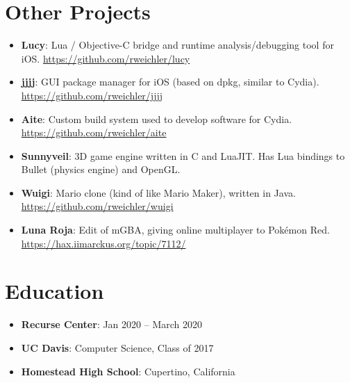 \documentclass[letterpaper,11pt]{article}
\newcommand{\resumeItem}[2]{
  \item\small{
    \textbf{#1}{: #2 \vspace{-2.5pt}}
  }
}
\newcommand{\resumeSubItem}[2]{\resumeItem{#1}{#2}\vspace{-4pt}}
\newcommand{\resumeSubHeadingListStart}{\begin{itemize}[leftmargin=*]}
\newcommand{\resumeSubHeadingListEnd}{\end{itemize}}
\begin{document}
\section{Other Projects}
  \resumeSubHeadingListStart
    \resumeSubItem{Lucy}
      {Lua / Objective-C bridge and runtime analysis/debugging tool for iOS. \href{https://github.com/rweichler/lucy}{https://github.com/rweichler/lucy}}
    \resumeSubItem{jjjj}
      {GUI package manager for iOS (based on dpkg, similar to Cydia).  \href{https://github.com/rweichler/jjjj}{https://github.com/rweichler/jjjj}}
    \resumeSubItem{Aite}
      {Custom build system used to develop software for Cydia. \href{https://github.com/rweichler/aite}{https://github.com/rweichler/aite}}
    \resumeSubItem{Sunnyveil}
      {3D game engine written in C and LuaJIT. Has Lua bindings to Bullet (physics engine) and OpenGL.}
    \resumeSubItem{Wuigi}
      {Mario clone (kind of like Mario Maker), written in Java. \href{https://github.com/rweichler/wuigi}{https://github.com/rweichler/wuigi}}
    \resumeSubItem{Luna Roja}
      {Edit of mGBA, giving online multiplayer to Pok\'emon Red.  \href{https://hax.iimarckus.org/topic/7112/}{https://hax.iimarckus.org/topic/7112/}}
  \resumeSubHeadingListEnd

  


\section{Education}
  \resumeSubHeadingListStart
    \resumeSubItem
      {Recurse Center}{Jan 2020 -- March 2020}
    \resumeSubItem
      {UC Davis}{Computer Science, Class of 2017}
    \resumeSubItem
      {Homestead High School}{Cupertino, California}
  \resumeSubHeadingListEnd
\end{document}
